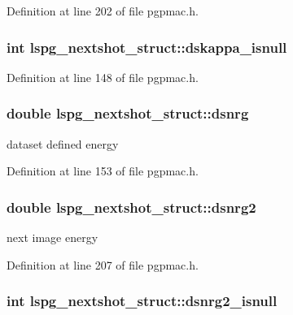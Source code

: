 Definition at line 202 of file pgpmac.h.\hypertarget{structlspg__nextshot__struct_a1686a72509cc1c3383ee95a790ddff14}{
\subsubsection[{dskappa\_\-isnull}]{\setlength{\rightskip}{0pt plus 5cm}int {\bf lspg\_\-nextshot\_\-struct::dskappa\_\-isnull}}}
\label{structlspg__nextshot__struct_a1686a72509cc1c3383ee95a790ddff14}


Definition at line 148 of file pgpmac.h.\hypertarget{structlspg__nextshot__struct_a371e574055fec7660b8f2e637eaf9f25}{
\subsubsection[{dsnrg}]{\setlength{\rightskip}{0pt plus 5cm}double {\bf lspg\_\-nextshot\_\-struct::dsnrg}}}
\label{structlspg__nextshot__struct_a371e574055fec7660b8f2e637eaf9f25}


dataset defined energy 

Definition at line 153 of file pgpmac.h.\hypertarget{structlspg__nextshot__struct_ae461439c2af31255227765c0fb61850f}{
\subsubsection[{dsnrg2}]{\setlength{\rightskip}{0pt plus 5cm}double {\bf lspg\_\-nextshot\_\-struct::dsnrg2}}}
\label{structlspg__nextshot__struct_ae461439c2af31255227765c0fb61850f}


next image energy 

Definition at line 207 of file pgpmac.h.\hypertarget{structlspg__nextshot__struct_aee9f8196dd9bcea832a60f2f0ea3a999}{
\subsubsection[{dsnrg2\_\-isnull}]{\setlength{\rightskip}{0pt plus 5cm}int {\bf lspg\_\-nextshot\_\-struct::dsnrg2\_\-isnull}}}
\label{structlspg__nextshot__struct_aee9f8196dd9bcea832a60f2f0ea3a999}


